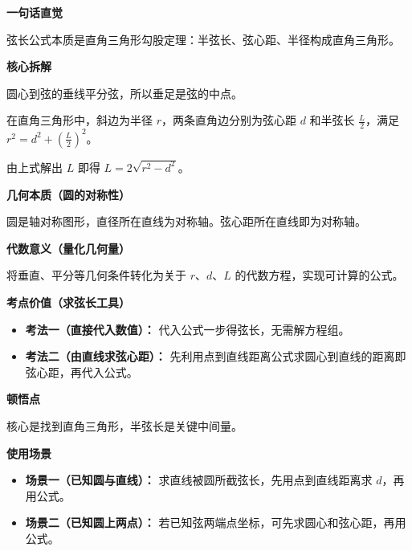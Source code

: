 \begin{explanationbox}
	\textbf{\textcolor{CExplanation}{一句话直觉}}

	弦长公式本质是直角三角形勾股定理：半弦长、弦心距、半径构成直角三角形。

	\medskip
	\textbf{\textcolor{CExplanation}{核心拆解}}
	\begin{description}[style=nextline, leftmargin=2.8em, labelsep=0.5em, itemsep=0.45em]
		\item[\textbf{要点一（垂径定理）：}] 圆心到弦的垂线平分弦，所以垂足是弦的中点。
		\item[\textbf{要点二（勾股关系）：}] 在直角三角形中，斜边为半径 $r$，两条直角边分别为弦心距 $d$ 和半弦长 $\frac{L}{2}$，满足 $r^{2}=d^{2}+\left(\frac{L}{2}\right)^{2}$。
		\item[\textbf{要点三（代数整理）：}] 由上式解出 $L$ 即得 $L=2\sqrt{r^{2}-d^{2}}$。
	\end{description}

	\medskip
	\textbf{\textcolor{CExplanation}{几何本质（圆的对称性）}}

	圆是轴对称图形，直径所在直线为对称轴。弦心距所在直线即为对称轴。

	\medskip
	\textbf{\textcolor{CExplanation}{代数意义（量化几何量）}}

	将垂直、平分等几何条件转化为关于 $r$、$d$、$L$ 的代数方程，实现可计算的公式。

	\medskip
	\textbf{\textcolor{CExplanation}{考点价值（求弦长工具）}}
	\begin{itemize}[leftmargin=*, itemsep=0.5em, topsep=0.4em]
		\item \textbf{考法一（直接代入数值）：} 代入公式一步得弦长，无需解方程组。
		\item \textbf{考法二（由直线求弦心距）：} 先利用点到直线距离公式求圆心到直线的距离即弦心距，再代入公式。
	\end{itemize}

	\medskip
	\textbf{\textcolor{CExplanation}{顿悟点}}

	核心是找到直角三角形，半弦长是关键中间量。

	\medskip
	\textbf{\textcolor{CExplanation}{使用场景}}
	\begin{itemize}[leftmargin=*, itemsep=0.5em, topsep=0.4em]
		\item \textbf{场景一（已知圆与直线）：} 求直线被圆所截弦长，先用点到直线距离求 $d$，再用公式。
		\item \textbf{场景二（已知圆上两点）：} 若已知弦两端点坐标，可先求圆心和弦心距，再用公式。
	\end{itemize}
\end{explanationbox}
